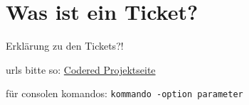\chapter{Was ist ein Ticket?}  %
\label{chapter:Was ist ein Ticket?}  %

Erklärung zu den Tickets?!

urls bitte so:
\href{http://codered.berlios.de}{Codered Projektseite}


für consolen komandos:
\verb|kommando -option parameter|
